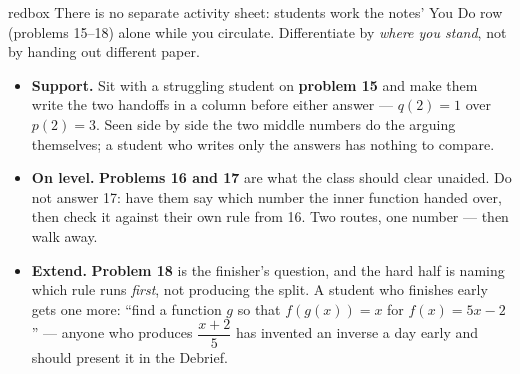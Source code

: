 \documentclass[10pt]{article}
\begin{document}
\begin{skillbox}{redbox}
There is no separate activity sheet: students work the notes' You Do row (problems 15--18) alone
while you circulate. Differentiate by \textit{where you stand}, not by handing out different
paper.

\begin{itemize}
  \item \textbf{Support.} Sit with a struggling student on \textbf{problem 15} and make them
        write the two handoffs in a column before either answer --- $q(2) = 1$ over $p(2) = 3$.
        Seen side by side the two middle numbers do the arguing themselves; a student who writes
        only the answers has nothing to compare.
  \item \textbf{On level.} \textbf{Problems 16 and 17} are what the class should clear unaided.
        Do not answer 17: have them say which number the inner function handed over, then check
        it against their own rule from 16. Two routes, one number --- then walk away.
  \item \textbf{Extend.} \textbf{Problem 18} is the finisher's question, and the hard half is
        naming which rule runs \textit{first}, not producing the split. A student who finishes
        early gets one more: ``find a function $g$ so that $f(g(x)) = x$ for $f(x) = 5x - 2$'' ---
        anyone who produces $\dfrac{x+2}{5}$ has invented an inverse a day early and should
        present it in the Debrief.
\end{itemize}
\end{skillbox}
\end{document}

